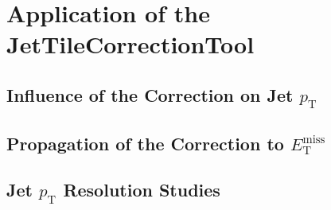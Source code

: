 \chapter{Application of the JetTileCorrectionTool}

\section{Influence of the Correction on Jet $p_{\mathrm{T}}$}

\section{Propagation of the Correction to $E_{\mathrm{T}}^{\mathrm{miss}}$}

\section{Jet $p_{\mathrm{T}}$ Resolution Studies}